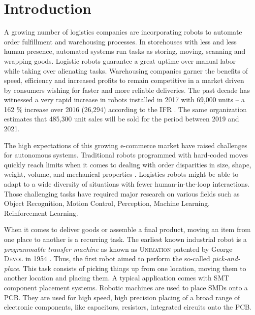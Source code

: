\documentclass[/home/francois/latex/report/main.tex]{subfiles}
\begin{document}
\chapter{Introduction}
\label{chapter:introduction}

A growing number of logistics companies are incorporating robots to automate order fulfillment and warehousing processes. In storehouses with less and less human presence, automated systems run tasks as storing, moving, scanning and wrapping goods. Logistic robots guarantee a great uptime over manual labor while taking over alienating tasks. Warehousing companies garner the benefits of speed, efficiency and increased profits to remain competitive in a market driven by consumers wishing for faster and more reliable deliveries. The past decade has witnessed a very rapid increase in robots installed in 2017 with 69,000 units – a 162 \% increase over 2016 (26,294) according to the \ac{IFR} \cite{industrialRobot2018}. The same organization estimates that 485,300 unit sales will be sold for the period between 2019 and 2021.

The high expectations of this growing e-commerce market have raised challenges for autonomous systems. Traditional robots programmed with hard-coded moves quickly reach limits when it comes to dealing with order disparities in size, shape, weight, volume, and mechanical properties \cite{GQHuang2015}. Logistics robots might be able to adapt to a wide diversity of situations with fewer human-in-the-loop interactions. Those challenging tasks have required major research on various fields such as Object Recognition, Motion Control, Perception, Machine Learning, Reinforcement Learning.

When it comes to deliver goods or assemble a final product, moving an item from one place to another is a recurring task. The earliest known industrial robot is a \textit{programmable transfer machine} as known as \textsc{Unimation} patented by George \textsc{Devol} in 1954 \cite{Wallen2008}. Thus, the first robot aimed to perform the so-called \textit{pick-and-place}. This task consists of picking things up from one location, moving them to another location and placing them. A typical application comes with \ac{SMT} component placement systems. Robotic machines are used to place \ac{SMDs} onto a \ac{PCB}. They are used for high speed, high precision placing of a broad range of electronic components, like capacitors, resistors, integrated circuits onto the \ac{PCB}.
\end{document}
